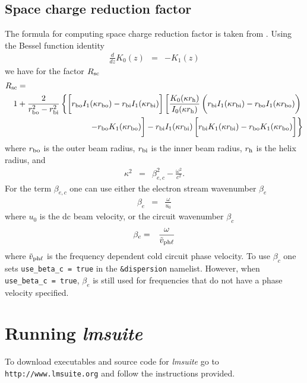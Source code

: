 \documentclass{article}
\newcommand\lmsuite{{\em lmsuite }}
\begin{document}
\subsection{Space charge reduction factor}
The formula for computing space charge reduction factor is taken
from \cite{antonsen:twtdnde98}. Using the Bessel function identity
\begin{eqnarray}
  \frac{d}{dz}K_0(z) & = & - K_1(z)
\end{eqnarray}
we have for the factor $R_{\rm sc}$
\begin{eqnarray}
  \lefteqn{R_{\rm sc} =} & & \nonumber\\
  && 1 + \frac{2}{r_{\rm bo}^2 - r_{\rm bi}^2}
  \left\{\left[\rule{0mm}{5mm}r_{\rm bo}I_1(\kappa r_{\rm bo})
      - r_{\rm bi}I_1(\kappa r_{\rm bi})\right]
    \left[\frac{K_0(\kappa r_{\rm h})}{I_0(\kappa r_{\rm h})}
      \left(\rule{0mm}{5mm}r_{\rm bi}I_1(\kappa r_{\rm bi})
        - r_{\rm bo}I_1(\kappa r_{\rm bo})
      \right)\right.\right.\nonumber\\
  && \left.\left. - r_{\rm bo} K_1(\kappa r_{\rm bo})\rule{0mm}{5mm}\right]
    - r_{\rm bi} I_1(\kappa r_{\rm bi})
    \left[\rule{0mm}{5mm}r_{\rm bi}K_1(\kappa r_{\rm bi})
      - r_{\rm bo}K_1(\kappa r_{\rm bo})\right]\right\}
\end{eqnarray}
where $r_{\rm bo}$ is the outer beam radius, $r_{\rm bi}$ is the inner
beam radius, $r_{\rm h}$ is the helix radius, and
\begin{eqnarray}
  \kappa^2 & = & \beta_{e,c}^2 - \frac{\omega^2}{c^2}.
\end{eqnarray}
For the term $\beta_{e,c}$ one can use either the electron stream 
wavenumber $\beta_e$
\begin{eqnarray}
  \beta_e & = & \frac{\omega}{u_0}
\end{eqnarray}
where $u_0$ is the dc beam velocity, or the circuit wavenumber $\beta_c$
\begin{eqnarray}
  \beta_c & = & \frac{\omega}{\tilde v_{{\rm ph}\ell}}
\end{eqnarray}
where $\tilde v_{{\rm ph}\ell}$ is the frequency dependent cold circuit
phase velocity. To use $\beta_c$ one sets {\tt use\_beta\_c = true}
in the {\tt \&dispersion} namelist. However, when {\tt use\_beta\_c = true},
$\beta_e$ is still used for frequencies that do not have a phase velocity
specified.

\section{Running \lmsuite}
To download executables and source code for \lmsuite go to\\
{\tt http://www.lmsuite.org} and follow
the instructions provided.
\end{document}
